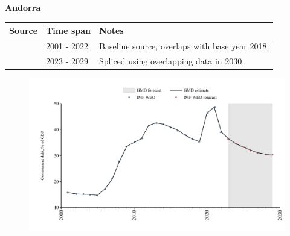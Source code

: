 \documentclass[12pt,a4paper,landscape]{article}
\begin{document}
\begin{adjustbox}{max totalsize={\paperwidth}{\paperheight},center}
\begin{minipage}[t][\textheight][t]{\textwidth}
\vspace*{0.5cm}
{}
\begin{center}
{\Large\bfseries Andorra}
\end{center}
\vspace{0.5cm}
\begin{table}[H]
\centering
\small
\begin{tabular}{|l|l|l|}
\hline
\textbf{Source} & \textbf{Time span} & \textbf{Notes} \\
\hline
\rowcolor{white}\cite{IMF_WEO}& 2001 - 2022 &Baseline source, overlaps with base year 2018.\\
\rowcolor{lightgray}\cite{IMF_WEO_forecast}& 2023 - 2029 &Spliced using overlapping data in 2030.\\
\hline
\end{tabular}
\end{table}
\begin{figure}[H]
\centering
\includegraphics[width=\textwidth,height=0.6\textheight,keepaspectratio]{graphs/AND_govdebt_GDP.pdf}
\end{figure}
\end{minipage}
\end{adjustbox}
\end{document}

